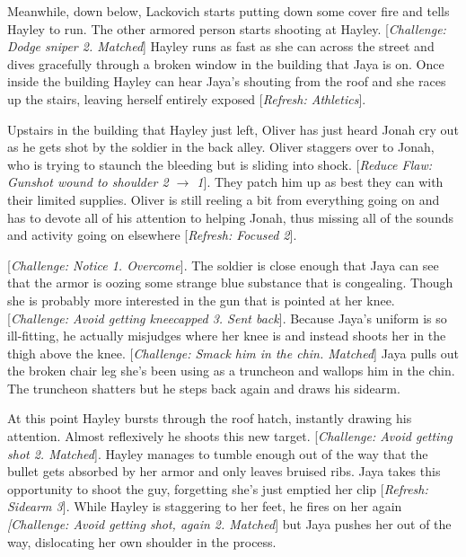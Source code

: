 
Meanwhile, down below, Lackovich starts putting down some cover fire and tells Hayley to run.  The other armored person starts shooting at Hayley.  {[}\textit{Challenge: Dodge sniper 2. Matched}{]}  Hayley runs as fast as she can across the street and dives gracefully through a broken window in the building that Jaya is on.  Once inside the building Hayley can hear Jaya's shouting from the roof and she races up the stairs, leaving herself entirely exposed {[}\textit{Refresh: Athletics}{]}.



Upstairs in the building that Hayley just left, Oliver has just heard Jonah cry out as he gets shot by the soldier in the back alley.  Oliver staggers over to Jonah, who is trying to staunch the bleeding but is sliding into shock.  {[}\textit{Reduce Flaw: Gunshot wound to shoulder 2 $\rightarrow$ 1}{]}.  They patch him up as best they can with their limited supplies.  Oliver is still reeling a bit from everything going on and has to devote all of his attention to helping Jonah, thus missing all of the sounds and activity going on elsewhere {[}\textit{Refresh: Focused 2}{]}.



{[}\textit{Challenge: Notice 1. Overcome}{]}. The soldier is close enough that Jaya can see that the armor is oozing some strange blue substance that is congealing.  Though she is probably more interested in the gun that is pointed at her knee.  {[}\textit{Challenge: Avoid getting kneecapped 3.  Sent back}{]}.  Because Jaya's uniform is so ill-fitting, he actually misjudges where her knee is and instead shoots her in the thigh above the knee.  {[}\textit{Challenge: Smack him in the chin.  Matched}{]} Jaya pulls out the broken chair leg she's been using as a truncheon and wallops him in the chin.  The truncheon shatters but he steps back again and draws his sidearm.



At this point Hayley bursts through the roof hatch, instantly drawing his attention.  Almost reflexively he shoots this new target.  {[}\textit{Challenge: Avoid getting shot 2.  Matched}{]}.   Hayley manages to tumble enough out of the way that the bullet gets absorbed by her armor and only leaves bruised ribs.  Jaya takes this opportunity to shoot the guy, forgetting she's just emptied her clip {[}\textit{Refresh: Sidearm 3}{]}.  While Hayley is staggering to her feet, he fires on her again \textit{{[}Challenge: Avoid getting shot, again 2.  Matched}{]} but Jaya pushes her out of the way, dislocating her own shoulder in the process. 



